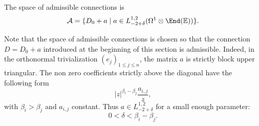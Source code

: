 \begin{definition}\label{def_admissible_connections_loc}
The space of admissible connections is
\[
\mathcal{A} =\lbrace D_0+a \mid a \in L^{1,2}_{-2+\delta}(\Omega^1\otimes \End (\mathbb{E}))\rbrace.
\]
\end{definition}
\begin{remark}
Note that the space of admissible connections is chosen so that the connection $D=D_0+a$ introduced at the beginning of this section is admissible. Indeed, in the orthonormal trivialization $\left(e_j\right)_{1\le j \le n}$, the matrix $a$ is strictly block upper triangular. The non zero coefficients strictly above the diagonal have the following form
\[
|z|^{\beta_i-\beta_j} \frac{a_{i,j}}{z},
\]
with $\beta_i > \beta_j$ and $a_{i,j}$ constant. Thus $a\in L^{1,2}_{-2+\delta}$ for a small enough parameter:
\[
0<\delta < \beta_i-\beta_j.
\]
\end{remark}


